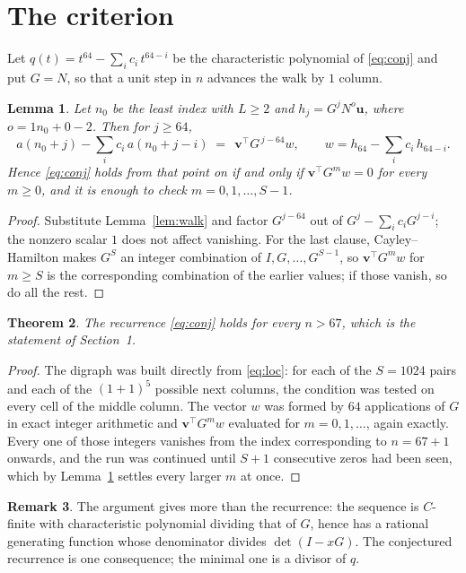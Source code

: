 \documentclass[11pt,a4paper]{article}
\theoremstyle{plain}
\newtheorem{theorem}{Theorem}
\newtheorem{lemma}[theorem]{Lemma}
\theoremstyle{definition}
\newtheorem{remark}[theorem]{Remark}
\begin{document}
\section{The criterion}

Let $q(t)=t^{64}-\sum_i c_i\,t^{64-i}$ be the characteristic polynomial of
\eqref{eq:conj} and put $G=N$, so that a unit step in $n$ advances the walk by
$1$ column.

\begin{lemma}\label{lem:crit}
Let $n_0$ be the least index with $L\ge2$ and $h_j=G^{j}N^{o}\mathbf{u}$, where
$o=1n_0+0-2$. Then for $j\ge64$,
\[
a(n_0+j)-\sum_i c_i\,a(n_0+j-i)\;=\;\,\mathbf{v}^{\!\top}G^{\,j-64}w,
\qquad w=h_{64}-\sum_i c_i\,h_{64-i} .
\]
Hence \eqref{eq:conj} holds from that point on if and only if
$\mathbf{v}^{\!\top}G^{m}w=0$ for every $m\ge0$, and it is enough to check
$m=0,1,\dots,S-1$.
\end{lemma}

\begin{proof}
Substitute Lemma~\ref{lem:walk} and factor $G^{j-64}$ out of
$G^{j}-\sum_ic_iG^{j-i}$; the nonzero scalar $1$ does not affect
vanishing. For the last clause, Cayley--Hamilton makes $G^{S}$ an integer combination of
$I,G,\dots,G^{S-1}$, so $\mathbf{v}^{\!\top}G^{m}w$ for $m\ge S$ is the corresponding
combination of the earlier values; if those vanish, so do all the rest.
\end{proof}

\begin{theorem}
The recurrence \eqref{eq:conj} holds for every $n>67$, which is the statement of
Section~1.
\end{theorem}

\begin{proof}
The digraph was built directly from \eqref{eq:loc}: for each of the $S=1024$ pairs and each
of the $(1+1)^{5}$ possible next columns, the condition was tested on every cell of
the middle column. The vector $w$ was formed by $64$ applications of $G$ in exact integer
arithmetic and $\mathbf{v}^{\!\top}G^{m}w$ evaluated for $m=0,1,\dots$, again exactly.
Every one of those integers vanishes from the index corresponding to $n=67+1$ onwards,
and the run was continued until $S+1$ consecutive zeros had been seen, which by
Lemma~\ref{lem:crit} settles every larger $m$ at once.
\end{proof}

\begin{remark}
The argument gives more than the recurrence: the sequence is $C$-finite with characteristic
polynomial dividing that of $G$, hence has a rational generating function whose denominator
divides $\det(I-xG)$. The conjectured recurrence is one consequence; the minimal one is a
divisor of $q$.
\end{remark}
\end{document}
